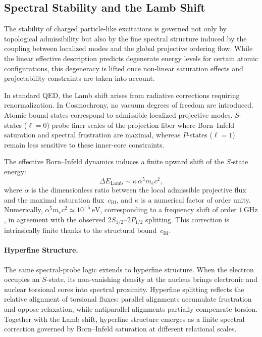 \subsection{Spectral Stability and the Lamb Shift}
  \label{subsec:lamb-shift}

  The stability of charged particle-like excitations is governed not only
  by topological admissibility but also by the fine spectral structure
  induced by the coupling between localized modes and the global projective ordering flow.
  While the linear effective description predicts degenerate energy levels
  for certain atomic configurations, this degeneracy is lifted once
  non-linear saturation effects and projectability constraints are taken
  into account.

  In standard QED, the Lamb shift arises from radiative corrections
  requiring renormalization.
  In Cosmochrony, no vacuum degrees of freedom are introduced.
  Atomic bound states correspond to admissible localized projective modes.
  $S$-states ($\ell=0$) probe finer scales of the projection fiber where
  Born--Infeld saturation and spectral frustration are maximal, whereas
  $P$-states ($\ell=1$) remain less sensitive to these inner-core
  constraints.

  The effective Born--Infeld dynamics induces a finite upward shift of the
  $S$-state energy:
  \begin{equation}
    \Delta E_{\mathrm{Lamb}}
    \sim \kappa\, \alpha^5 m_e c^2 ,
  \end{equation}
  where $\alpha$ is the dimensionless ratio between the local admissible
  projective flux and the maximal saturation flux~$c_{\mathrm{BI}}$, and $\kappa$ is a
  numerical factor of order unity.
  Numerically, $\alpha^5 m_e c^2 \simeq 10^{-5}\,\mathrm{eV}$,
  corresponding to a frequency shift of order $1\,\mathrm{GHz}$, in
  agreement with the observed $2S_{1/2}$--$2P_{1/2}$ splitting.
  This correction is intrinsically finite thanks to the structural bound~$c_{\mathrm{BI}}$.

  \paragraph{Hyperfine Structure.}
    The same spectral-probe logic extends to hyperfine structure.
    When the electron occupies an $S$-state, its non-vanishing density at the
    nucleus brings electronic and nuclear torsional cores into spectral
    proximity.
    Hyperfine splitting reflects the relative alignment of torsional fluxes:
    parallel alignments accumulate frustration and oppose relaxation, while
    antiparallel alignments partially compensate torsion.
    Together with the Lamb shift, hyperfine structure emerges as a finite
    spectral correction governed by Born--Infeld saturation at different
    relational scales.
